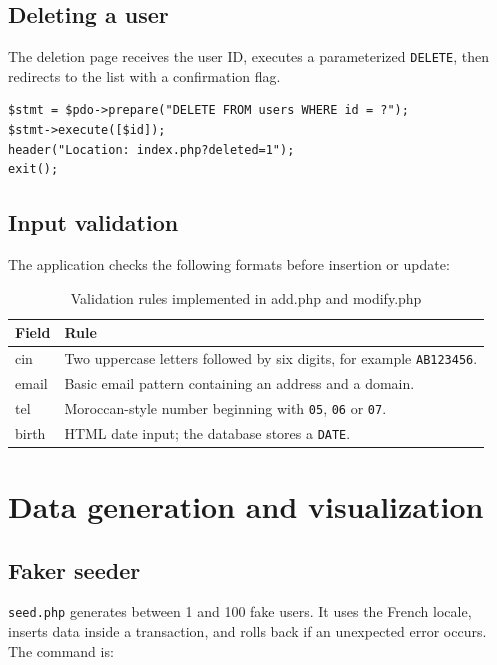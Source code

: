 \documentclass[12pt,a4paper]{article}
\begin{document}
\subsection{Deleting a user}

The deletion page receives the user ID, executes a parameterized
\texttt{DELETE}, then redirects to the list with a confirmation flag.

\begin{lstlisting}[caption={Core deletion logic}]
$stmt = $pdo->prepare("DELETE FROM users WHERE id = ?");
$stmt->execute([$id]);
header("Location: index.php?deleted=1");
exit();
\end{lstlisting}

\subsection{Input validation}

The application checks the following formats before insertion or update:

\begin{table}[H]
\centering
\begin{tabular}{>{\ttfamily}p{}p{}}
\toprule
\textnormal{Field} & \textnormal{Rule}\\
\midrule
cin & Two uppercase letters followed by six digits, for example \texttt{AB123456}.\\
email & Basic email pattern containing an address and a domain.\\
tel & Moroccan-style number beginning with \texttt{05}, \texttt{06} or \texttt{07}.\\
birth & HTML date input; the database stores a \texttt{DATE}.\\
\bottomrule
\end{tabular}
\caption{Validation rules implemented in add.php and modify.php}
\end{table}

\section{Data generation and visualization}

\subsection{Faker seeder}

\texttt{seed.php} generates between 1 and 100 fake users. It uses the French
locale, inserts data inside a transaction, and rolls back if an unexpected
error occurs. The command is:
\end{document}
